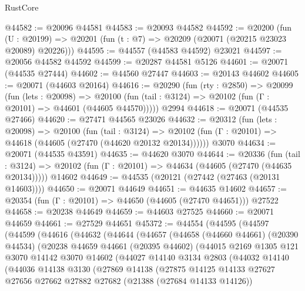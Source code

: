 \begin{lexlean}{RustCore}
\begin{coremodule}
@44582 := @20096 @44581
@44583 := @20093 @44582
@44592 := @20200
    (fun (U : @20199) => @20201 (fun (t : @7) => @20209 (@20071 (@20215 @23023 @20089) @20226)))
@44595 := @44557 (@44583 @44592) @23021
@44597 := @20056 @44582 @44592
@44599 := @20287 @44581 @5126
@44601 := @20071 (@44535 @27444)
@44602 := @44560 @27447
@44603 := @20143 @44602
@44605 := @20071 (@44603 @20164)
@44616 := @20290
    (fun (rty : @2850) =>
    @20099
      (fun (lets : @20098) =>
      @20100 (fun (tail : @3124) => @20102 (fun (Γ : @20101) => @44601 (@44605 @44570)))))
    @2994
@44618 := @20071 (@44535 @27466)
@44620 := @27471 @44565 @23026
@44632 := @20312
    (fun (lets : @20098) =>
    @20100
      (fun (tail : @3124) =>
      @20102 (fun (Γ : @20101) => @44618 (@44605 (@27470 (@44620 @20132 @20134))))))
    @3070
@44634 := @20071 (@44535 @43591)
@44635 := @44620 @3070
@44644 := @20336
    (fun (tail : @3124) => @20102 (fun (Γ : @20101) => @44634 (@44605 (@27470 (@44635 @20134)))))
    @14602
@44649 := @44535 (@20121 (@27442 (@27463 (@20131 @14603))))
@44650 := @20071 @44649
@44651 := @44635 @14602
@44657 := @20354 (fun (Γ : @20101) => @44650 (@44605 (@27470 @44651))) @27522
@44658 := @20238 @44649
@44659 := @44603 @27525
@44660 := @20071 @44659
@44661 := @27529 @44651
@45372 := @44554
    (@44595
      (@44597
        (@44599
          (@44616
            (@44632
              (@44644
                (@44657
                  (@44658
                    (@44660 @44661)
                    (@20390 @44534)
                    (@20238
                      @44659
                      @44661
                      (@20395 @44602)
                      (@44015
                        @2169
                        @1305
                        @121
                        @3070
                        @14142
                        @3070
                        @14602
                        (@44027
                          @14140
                          @3134
                          @2803
                          (@44032
                            @14140
                            (@44036
                              @14138
                              @3130
                              (@27869
                                @14138
                                (@27875
                                  @14125
                                  @14133
                                  @27627
                                  @27656
                                  @27662
                                  @27882
                                  @27682
                                  (@21388 (@27684 @14133 @14126))

\end{coremodule}
\end{lexlean}
